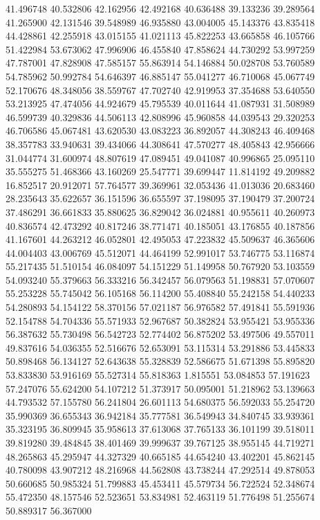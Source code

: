 41.496748
40.532806
42.162956
42.492168
40.636488
39.133236
39.289564
41.265900
42.131546
39.548989
46.935880
43.004005
45.143376
43.835418
44.428861
42.255918
43.015155
41.021113
45.822253
43.665858
46.105766
51.422984
53.673062
47.996906
46.455840
47.858624
44.730292
53.997259
47.787001
47.828908
47.585157
55.863914
54.146884
50.028708
53.760589
54.785962
50.992784
54.646397
46.885147
55.041277
46.710068
45.067749
52.170676
48.348056
38.559767
47.702740
42.919953
37.354688
53.640550
53.213925
47.474056
44.924679
45.795539
40.011644
41.087931
31.508989
46.599739
40.329836
44.506113
42.808996
45.960858
44.039543
29.320253
46.706586
45.067481
43.620530
43.083223
36.892057
44.308243
46.409468
38.357783
33.940631
39.434066
44.308641
47.570277
48.405843
42.956666
31.044774
31.600974
48.807619
47.089451
49.041087
40.996865
25.095110
35.555275
51.468366
43.160269
25.547771
39.699447
11.814192
49.209882
16.852517
20.912071
57.764577
39.369961
32.053436
41.013036
20.683460
28.235643
35.622657
36.151596
36.655597
37.198095
37.190479
37.200724
37.486291
36.661833
35.880625
36.829042
36.024881
40.955611
40.260973
40.836574
42.473292
40.817246
38.771471
40.185051
43.176855
40.187856
41.167601
44.263212
46.052801
42.495053
47.223832
45.509637
46.365606
44.004403
43.006769
45.512071
44.464199
52.991017
53.746775
53.116874
55.217435
51.510154
46.084097
54.151229
51.149958
50.767920
53.103559
54.093240
55.379663
56.333216
56.342457
56.079563
51.198831
57.070607
55.253228
55.745042
56.105168
56.114200
55.408840
55.242158
54.440233
54.280893
54.154122
58.370156
57.021187
56.976582
57.491841
55.591936
52.154788
54.704336
55.571933
52.967687
50.382824
53.955421
53.955336
56.387632
55.730498
56.542723
52.774402
56.875202
53.497506
49.557011
49.837616
54.036355
52.516676
52.653091
53.115314
53.291886
53.445833
50.898468
56.134127
52.643638
55.328839
52.586675
51.671398
55.895820
53.833830
53.916169
55.527314
55.818363
1.815551
53.084853
57.191623
57.247076
55.624200
54.107212
51.373917
50.095001
51.218962
53.139663
44.793532
57.155780
56.241804
26.601113
54.680375
56.592033
55.254720
35.990369
36.655343
36.942184
35.777581
36.549943
34.840745
33.939361
35.323195
36.809945
35.958613
37.613068
37.765133
36.101199
39.518011
39.819280
39.484845
38.401469
39.999637
39.767125
38.955145
44.719271
48.265863
45.295947
44.327329
40.665185
44.654240
43.402201
45.862145
40.780098
43.907212
48.216968
44.562808
43.738244
47.292514
49.878053
50.660685
50.985324
51.799883
45.453411
45.579734
56.722524
52.348674
55.472350
48.157546
52.523651
53.834981
52.463119
51.776498
51.255674
50.889317
56.367000
